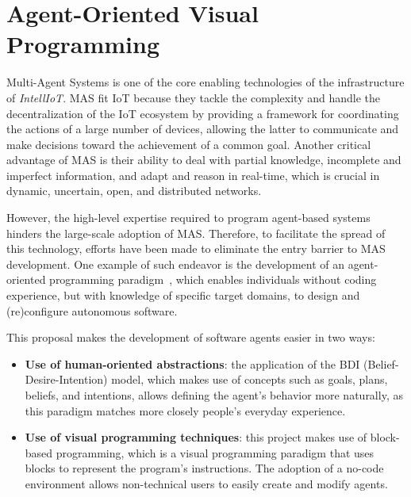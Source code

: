 \section{Agent-Oriented Visual Programming}
Multi-Agent Systems is one of the core enabling technologies of the infrastructure of \textit{IntellIoT}.
MAS fit IoT because they tackle the complexity and handle the decentralization of the IoT ecosystem by providing a framework for coordinating the actions of a large number of devices, allowing the latter to communicate and make decisions toward the achievement of a common goal.
Another critical advantage of MAS is their ability to deal with partial knowledge, incomplete and imperfect information, and adapt and reason in real-time, which is crucial in dynamic, uncertain, open, and distributed networks.

However, the high-level expertise required to program agent-based systems hinders the large-scale adoption of MAS.
Therefore, to facilitate the spread of this technology, efforts have been made to eliminate the entry barrier to MAS development.
One example of such endeavor is the development of an agent-oriented programming paradigm~\cite{SHOHAM199351}\cite{burattini2022agent}, which enables individuals without coding experience, but with knowledge of specific target domains, to design and (re)configure autonomous software.

This proposal makes the development of software agents easier in two ways:
\begin{itemize}
    \item \textbf{Use of human-oriented abstractions}: the application of the BDI (Belief-Desire-Intention) model, which makes use of concepts such as goals, plans, beliefs, and intentions, allows defining the agent's behavior more naturally, as this paradigm matches more closely people's everyday experience.
    \item \textbf{Use of visual programming techniques}: this project makes use of block-based programming, which is a visual programming paradigm that uses blocks to represent the program's instructions.
    The adoption of a no-code environment allows non-technical users to easily create and modify agents.
\end{itemize}

